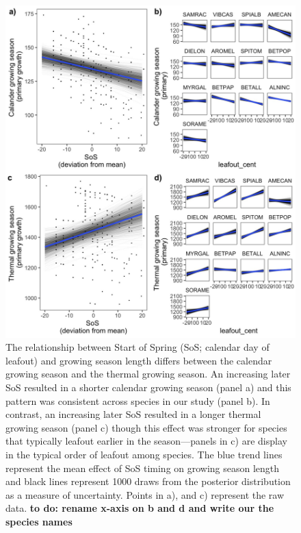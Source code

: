 \documentclass{article}[12pt]
\begin{document}
\begin{figure}[h!]
    \centering
 \includegraphics[width=.7\textwidth]{..//analyses/figures/primarygrowingseason_modplots.jpeg}
    \caption{The relationship between Start of Spring (SoS; calendar day of leafout) and growing season length differs between the calendar growing season and the thermal growing season. An increasing later SoS resulted in a shorter calendar growing season (panel a) and this pattern was consistent across species in our study (panel b). In contrast, an increasing later SoS resulted in a longer thermal growing season (panel c) though this effect was stronger for species that typically leafout earlier in the season---panels in c) are display in the typical order of leafout among species. The blue trend lines represent the mean effect of SoS timing on growing season length and black lines represent 1000 draws from the posterior distribution as a measure of uncertainty. Points in a), and c) represent the raw data. \textbf{to do: rename x-axis on b and d and write our the species names}}
    \label{fig:thermcal}
\end{figure}
\end{document}

